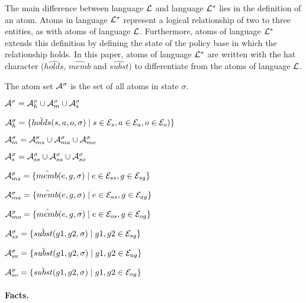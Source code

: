 \documentclass[global,twocolumn,draft]{svjour}
\newenvironment{vquote}
  {\begin{list}{}{\leftmargin 1em}\item[]}
  {\end{list}}
\begin{document}
          The main difference between language ${\cal L}$ and language
          ${\cal L}^{*}$ lies in the definition of an atom. Atoms in language
          ${\cal L}^{*}$ represent a logical relationship of two to three
          entities, as with atoms of language ${\cal L}$. Furthermore, atoms of
          language ${\cal L}^{*}$ extends this definition by defining the
          state of the policy base in which the relationship holds. In this
          paper, atoms of language ${\cal L}^{*}$ are written with the
          hat character ($\hat{holds}$, $\hat{memb}$ and $\hat{subst}$) to
          differentiate from the atoms of language ${\cal L}$.

          The atom set ${\cal A}^{\sigma}$ is the set of all atoms in state
          $\sigma$.

          \begin{vquote}
            ${\cal A}^{\sigma} = {\cal A}^{\sigma}_{h} \cup {\cal A}^{\sigma}_{m} \cup {\cal A}^{\sigma}_{s}$

            ${\cal A}^{\sigma}_{h} = \{\hat{holds}(s, a, o, \sigma) \mid s \in {\cal E}_{s}, a \in {\cal E}_{a}, o \in {\cal E}_{o})\}$

            ${\cal A}^{\sigma}_{m} = {\cal A}^{\sigma}_{ms} \cup {\cal A}^{\sigma}_{ma} \cup {\cal A}^{\sigma}_{mo}$

            ${\cal A}^{\sigma}_{s} = {\cal A}^{\sigma}_{ss} \cup {\cal A}^{\sigma}_{sa} \cup {\cal A}^{\sigma}_{so}$

            ${\cal A}^{\sigma}_{ms} = \{\hat{memb}(e, g, \sigma) \mid e \in {\cal E}_{ss}, g \in {\cal E}_{sg}\}$

            ${\cal A}^{\sigma}_{ma} = \{\hat{memb}(e, g, \sigma) \mid e \in {\cal E}_{as}, g \in {\cal E}_{ag}\}$

            ${\cal A}^{\sigma}_{mo} = \{\hat{memb}(e, g, \sigma) \mid e \in {\cal E}_{os}, g \in {\cal E}_{og}\}$

            ${\cal A}^{\sigma}_{ss} = \{\hat{subst}(g1, g2, \sigma) \mid g1, g2 \in {\cal E}_{sg}\}$

            ${\cal A}^{\sigma}_{sa} = \{\hat{subst}(g1, g2, \sigma) \mid g1, g2 \in {\cal E}_{ag}\}$

            ${\cal A}^{\sigma}_{so} = \{\hat{subst}(g1, g2, \sigma) \mid g1, g2 \in {\cal E}_{og}\}$
          \end{vquote}

        \paragraph{Facts.}
\end{document}
